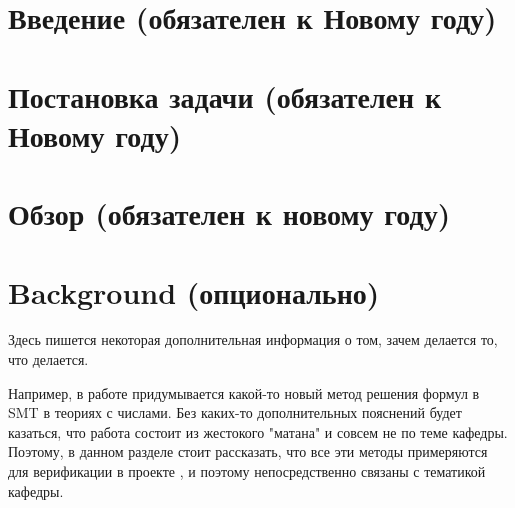 



\usepackage{totcount}

\usepackage{caption}
\usepackage{listings}




\maketitle
\setcounter{tocdepth}{2}
\tableofcontents


\section{Введение (обязателен к Новому году)}


\section{Постановка задачи (обязателен к Новому году)}


\section{Обзор (обязателен к новому году)}


\section{Background (опционально)}
Здесь пишется некоторая дополнительная информация о том, зачем делается то, что делается.

Например, в работе придумывается какой-то новый метод решения формул в SMT в теориях с числами. Без каких-то дополнительных пояснений будет казаться, что работа состоит из жестокого "матана" и совсем не по теме кафедры. Поэтому, в данном разделе стоит рассказать, что все эти методы примеряются для верификации в проекте \vsharp{}, и поэтому непосредственно связаны с тематикой кафедры.


